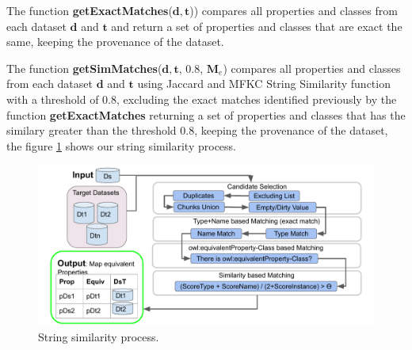 
The function \textbf{getExactMatches}($\mathbf{d},\mathbf{t}$)) compares all properties and classes from each dataset $\mathbf{d}$ and $\mathbf{t}$ and return a set of properties and classes that are exact the same, keeping the provenance of the dataset.

The function \textbf{getSimMatches}($\mathbf{d},\mathbf{t}$, 0.8, $\mathbf{M}_e$) compares all properties and classes from each dataset $\mathbf{d}$ and $\mathbf{t}$ using Jaccard and MFKC\cite{valdestilhas2017high} String Similarity function with a threshold of 0.8, excluding the exact matches identified previously by the function \textbf{getExactMatches} returning a set of properties and classes that has the similary greater than the threshold 0.8, keeping the provenance of the dataset, the figure \ref{fig:simMatch} shows our string similarity process.
\begin{figure}[htb] 
	\centering
	\includegraphics[width=\linewidth]{img/stringSim.pdf}
	\caption{String similarity process.}
	\label{fig:simMatch}
\end{figure}

